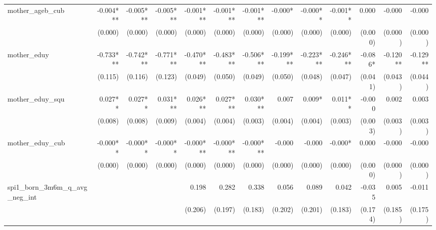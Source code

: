 \begin{tabular}{lrrrrrrrrrrrr}
mother\_ageb\_cub                           &    -0.004*** &    -0.005*** &    -0.005*** &    -0.001*** &    -0.001*** &    -0.001*** &      -0.000* &     -0.000** &     -0.001** &        0.000 &       -0.000 &       -0.000 \\ 
                                            &      (0.000) &      (0.000) &      (0.000) &      (0.000) &      (0.000) &      (0.000) &      (0.000) &      (0.000) &      (0.000) &      (0.000) &      (0.000) &      (0.000) \\ 
mother\_eduy                                &    -0.733*** &    -0.742*** &    -0.771*** &    -0.470*** &    -0.483*** &    -0.506*** &    -0.199*** &    -0.223*** &    -0.246*** &      -0.086* &     -0.120** &     -0.129** \\ 
                                            &      (0.115) &      (0.116) &      (0.123) &      (0.049) &      (0.050) &      (0.049) &      (0.050) &      (0.048) &      (0.047) &      (0.041) &      (0.043) &      (0.044) \\ 
mother\_eduy\_squ                           &      0.027** &      0.027** &     0.031*** &     0.026*** &     0.027*** &     0.030*** &        0.007 &       0.009* &      0.011** &       -0.000 &        0.002 &        0.003 \\ 
                                            &      (0.008) &      (0.008) &      (0.009) &      (0.004) &      (0.004) &      (0.003) &      (0.004) &      (0.004) &      (0.003) &      (0.003) &      (0.003) &      (0.003) \\ 
mother\_eduy\_cub                           &     -0.000** &     -0.000** &     -0.000** &    -0.000*** &    -0.000*** &    -0.000*** &       -0.000 &       -0.000 &      -0.000* &        0.000 &       -0.000 &       -0.000 \\ 
                                            &      (0.000) &      (0.000) &      (0.000) &      (0.000) &      (0.000) &      (0.000) &      (0.000) &      (0.000) &      (0.000) &      (0.000) &      (0.000) &      (0.000) \\ 
spi1\_born\_3m6m\_q\_avg\_neg\_int          &              &              &              &        0.198 &        0.282 &        0.338 &        0.056 &        0.089 &        0.042 &       -0.035 &        0.005 &       -0.011 \\ 
                                            &              &              &              &      (0.206) &      (0.197) &      (0.183) &      (0.202) &      (0.201) &      (0.183) &      (0.174) &      (0.185) &      (0.175) \\ 

\end{tabular}
